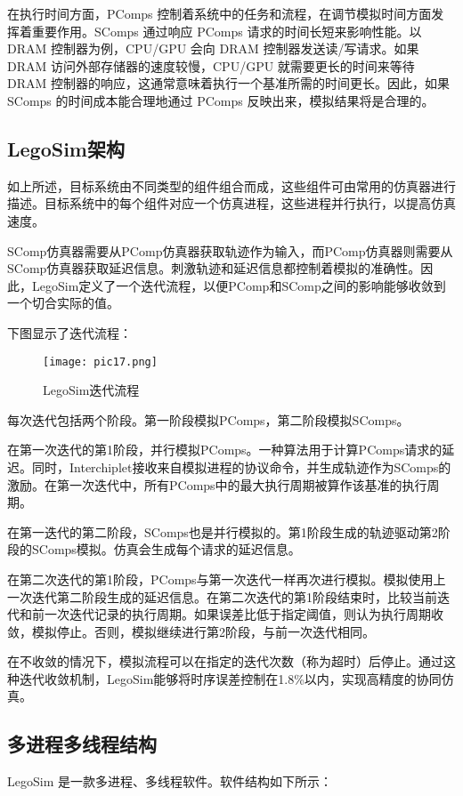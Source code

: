 \documentclass[bachelor]{thesis-uestc}
\begin{document}
在执行时间方面，PComps 控制着系统中的任务和流程，在调节模拟时间方面发挥着重要作用。SComps 通过响应 PComps 请求的时间长短来影响性能。以 DRAM 控制器为例，CPU/GPU 会向 DRAM 控制器发送读/写请求。如果 DRAM 访问外部存储器的速度较慢，CPU/GPU 就需要更长的时间来等待 DRAM 控制器的响应，这通常意味着执行一个基准所需的时间更长。因此，如果 SComps 的时间成本能合理地通过 PComps 反映出来，模拟结果将是合理的。


\subsection{LegoSim架构}
如上所述，目标系统由不同类型的组件组合而成，这些组件可由常用的仿真器进行描述。目标系统中的每个组件对应一个仿真进程，这些进程并行执行，以提高仿真速度。

SComp仿真器需要从PComp仿真器获取轨迹作为输入，而PComp仿真器则需要从SComp仿真器获取延迟信息。刺激轨迹和延迟信息都控制着模拟的准确性。因此，LegoSim定义了一个迭代流程，以便PComp和SComp之间的影响能够收敛到一个切合实际的值。

下图显示了迭代流程：
\begin{figure}[h]
    \texttt{[image: pic17.png]}
    \caption{LegoSim迭代流程}
    \label{pic17}
\end{figure}

每次迭代包括两个阶段。第一阶段模拟PComps，第二阶段模拟SComps。

在第一次迭代的第1阶段，并行模拟PComps。一种算法用于计算PComps请求的延迟。同时，Interchiplet接收来自模拟进程的协议命令，并生成轨迹作为SComps的激励。在第一次迭代中，所有PComps中的最大执行周期被算作该基准的执行周期。

在第一迭代的第二阶段，SComps也是并行模拟的。第1阶段生成的轨迹驱动第2阶段的SComps模拟。仿真会生成每个请求的延迟信息。

在第二次迭代的第1阶段，PComps与第一次迭代一样再次进行模拟。模拟使用上一次迭代第二阶段生成的延迟信息。在第二次迭代的第1阶段结束时，比较当前迭代和前一次迭代记录的执行周期。如果误差比低于指定阈值，则认为执行周期收敛，模拟停止。否则，模拟继续进行第2阶段，与前一次迭代相同。

在不收敛的情况下，模拟流程可以在指定的迭代次数（称为超时）后停止。通过这种迭代收敛机制，LegoSim能够将时序误差控制在1.8\%以内，实现高精度的协同仿真。


\subsection{多进程多线程结构}
LegoSim 是一款多进程、多线程软件。软件结构如下所示：
\end{document}
